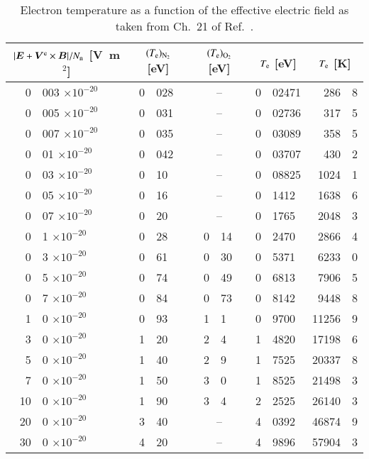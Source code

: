 \documentclass{warpdoc}
\renewcommand{\fontsizetable}{\scalefont{0.85}}
\renewcommand{\vec}[1]{\bm{#1}}
\let\citen\cite
\begin{document}
%
\begin{table}
  \center\fontsizetable
  \begin{threeparttable}
    \caption{Electron temperature as a function of the effective electric field as taken from Ch.\ 21 of Ref.\ \citen{book:1997:grigoriev}.}
    \label{tab:Te2}
    \fontsizetable
    \begin{tabular}{r@{.}lr@{.}lr@{.}lr@{.}lr@{.}l}
    \toprule
    \multicolumn{2}{c}{$|\vec{E}+\vec{V}^{\rm e} \times \vec{B}|/N_{\rm n}$ [V~m$^2$]}  & \multicolumn{2}{c}{$(T_{\rm e})_{\rm N_2}$ [eV]} & \multicolumn{2}{c}{$(T_{\rm e})_{\rm O_2}$ [eV]} & \multicolumn{2}{c}{$T_{\rm e}$ [eV]} &  \multicolumn{2}{c}{$T_{\rm e}$ [K]} \\
    \midrule
      0&003 $\times 10^{-20}$  &  0&028  &  \multicolumn{2}{c}{--}  &  0&02471       &  286&8\\
      0&005 $\times 10^{-20}$  &  0&031  &  \multicolumn{2}{c}{--}  &  0&02736       &  317&5\\
      0&007 $\times 10^{-20}$  &  0&035  &  \multicolumn{2}{c}{--}  &  0&03089       &  358&5\\
      0&01 $\times 10^{-20}$   &  0&042  &  \multicolumn{2}{c}{--}  &  0&03707       &  430&2\\
      0&03 $\times 10^{-20}$   &  0&10   &  \multicolumn{2}{c}{--}  &  0&08825       & 1024&1\\
      0&05 $\times 10^{-20}$   &  0&16   &  \multicolumn{2}{c}{--}  &  0&1412        & 1638&6\\
      0&07 $\times 10^{-20}$   &  0&20   &  \multicolumn{2}{c}{--}  &  0&1765        & 2048&3\\
      0&1 $\times 10^{-20}$    &  0&28   &  0&14                    &  0&2470        & 2866&4\\
      0&3 $\times 10^{-20}$    &  0&61   &  0&30                    &  0&5371        & 6233&0\\
      0&5 $\times 10^{-20}$    &  0&74   &  0&49                    &  0&6813        & 7906&5\\
      0&7 $\times 10^{-20}$    &  0&84   &  0&73                    &  0&8142        & 9448&8\\
      1&0 $\times 10^{-20}$    &  0&93   &  1&1                     &  0&9700        &11256&9\\
      3&0 $\times 10^{-20}$    &  1&20   &  2&4                     &  1&4820        &17198&6\\
      5&0 $\times 10^{-20}$    &  1&40   &  2&9                     &  1&7525        &20337&8\\
      7&0 $\times 10^{-20}$    &  1&50   &  3&0                     &  1&8525        &21498&3\\
     10&0 $\times 10^{-20}$    &  1&90   &  3&4                     &  2&2525        &26140&3\\
     20&0 $\times 10^{-20}$    &  3&40   &  \multicolumn{2}{c}{--}  &  4&0392        &46874&9\\
     30&0 $\times 10^{-20}$    &  4&20   &  \multicolumn{2}{c}{--}  &  4&9896        &57904&3\\
    \bottomrule
    \end{tabular}
   \end{threeparttable}
\end{table}
\end{document}
